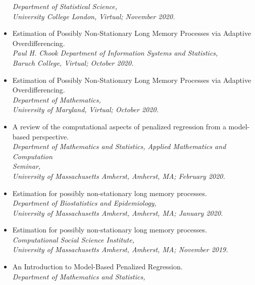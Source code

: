 \documentclass[11pt]{article}
\newcommand{\tab}{\hspace*{2em}}
\begin{document}
\begin{itemize}
	\tab \emph{Department of Statistical Science,}\\ 
	\tab \emph{University College London, Virtual; November 2020.} \vspace{-2mm}
	\item[] Estimation of Possibly Non-Stationary Long Memory Processes via Adaptive \\
	Overdifferencing. \\
	\tab \emph{Paul H. Chook Department of Information Systems and Statistics,}\\ 
	\tab \emph{Baruch College, Virtual; October 2020.} \vspace{-2mm}
	\item[] Estimation of Possibly Non-Stationary Long Memory Processes via Adaptive \\
	Overdifferencing. \\
	\tab \emph{Department of Mathematics,}\\ 
	\tab \emph{University of Maryland, Virtual; October 2020.} \vspace{-2mm}
	\item[] A review of the computational aspects of penalized regression from a model-based perspective. \\
	\tab \emph{Department of Mathematics and Statistics, Applied Mathematics and Computation} \\
	\tab \emph{Seminar,}\\ 
	\tab \emph{University of Massachusetts Amherst, Amherst, MA; February 2020.} \vspace{-2mm}
	\item[] Estimation for possibly non-stationary long memory processes. \\
	\tab \emph{Department of Biostatistics and Epidemiology,}\\ 
	\tab \emph{University of Massachusetts Amherst, Amherst, MA; January 2020.} \vspace{-2mm}
	\item[] Estimation for possibly non-stationary long memory processes. \\
	\tab \emph{Computational Social Science Institute,}\\ 
	\tab \emph{University of Massachusetts Amherst, Amherst, MA; November 2019.} \vspace{-2mm}
	\item[] An Introduction to Model-Based Penalized Regression. \\
	\tab \emph{Department of Mathematics and Statistics,}\\ 

\end{itemize}
\end{document}
